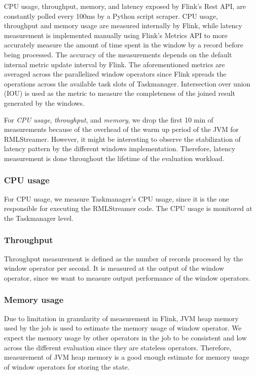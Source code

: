 CPU usage, throughput, memory, and latency exposed 
by Flink's Rest API, are constantly polled every 100ms by a 
Python script scraper.
CPU usage, throughput 
and memory usage are measured internally by Flink,
while latency measurement 
is implemented manually using Flink's Metrics API to more accurately measure the amount of 
time spent in the window by a record before being processed. The accuracy of the 
measurements depends on the default internal metric update interval by Flink.
The aforementioned metrics are averaged across the parallelized window operators since 
Flink spreads the operations across the available task slots of Taskmanager. 
Intersection over union (IOU) is used as the metric to measure the completeness
of the joined result generated by the windows.  

For \emph{CPU usage}, \emph{throughput}, and \emph{memory}, we drop the first 10 min of 
measurements because of the overhead of the warm up period of the JVM for RMLStreamer. 
However, it might be interesting to observe the stabilization of latency pattern by the 
different windows implementation. Therefore, latency measurement is done throughout the 
lifetime of the evaluation workload. 

\subsubsection{CPU usage}%
\label{ssub:CPU usage}
For CPU usage, we measure Taskmanager's CPU usage, since it is 
the one responsible for executing the RMLStreamer code. The CPU usage is 
monitored at the Taskmanager level. 

\subsubsection{Throughput}%
\label{ssub:Throughput}
Throughput measurement is defined as the number of records processed by the 
window operator per second. 
It is measured at the output of the window operator, since we want to measure 
output performance of the window operators. 


\subsubsection{Memory usage}%
\label{ssub:Memory usage}
Due to limitation in granularity of measurement in Flink, 
JVM heap memory used by the job is used to estimate the memory usage of window 
operator. We expect the memory usage by other operators in the job to be 
consistent and low across the different evaluation since they are stateless operators.
Therefore, measurement of JVM heap memory is a good enough estimate for memory usage 
of window operators for storing the state. 


